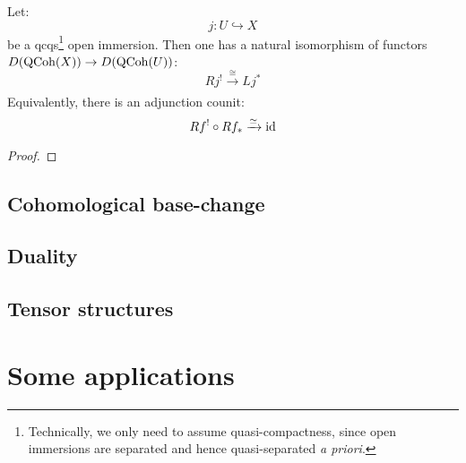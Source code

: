             \begin{theorem} \label{theorem: extending_qcoh_from_qc_open_subschemes}
                Let:
                    $$j: U \hookrightarrow X$$
                be a qcqs\footnote{Technically, we only need to assume quasi-compactness, since open immersions are separated and hence quasi-separated \textit{a priori}.} open immersion. Then one has a natural isomorphism of functors $D(\mathrm{QCoh}(X)) \to D(\mathrm{QCoh}(U))$:
                    $$Rj^! \xrightarrow[]{\cong} Lj^*$$
                Equivalently, there is an adjunction counit:
                    $$Rf^! \circ Rf_* \xrightarrow[]{\simeq} \mathrm{id}$$
            \end{theorem}
                \begin{proof}
                    
                \end{proof}

        \subsection{Cohomological base-change}

        \subsection{Duality}

        \subsection{Tensor structures}

    \section{Some applications}
